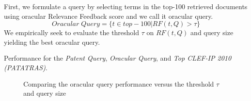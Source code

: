 First, we formulate a query by selecting terms in the top-100 retrieved documents using oracular Relevance Feedback score and we call it oracular query. 
\begin{equation}
Oracular \; Query = \{t \in top-100|RF(t, Q)>\tau\}   
 \label{eq:score}
\end{equation}
We empirically seek to evaluate the threshold $\tau$ on $RF(t,Q)$ and query size yielding the best oracular query.
\begin{table}[t!]
  \begin{center}
  \scriptsize
   \caption{Performance for the \textit{Patent Query}, \textit{ Oracular Query}, and \textit{ Top CLEF-IP 2010 (PATATRAS)}.}
   \vspace*{1ex}
     
  \label{tab:optquery}
  \end{center}  
\end{table}
\begin{figure}[t!]
\begin{centering}
 \hspace*{1.5cm}  
\par\end{centering} 
\protect\caption{Comparing the oracular query performance versus the threshold $\tau$ and query size}
\label{fig:oracular}
\end{figure}

